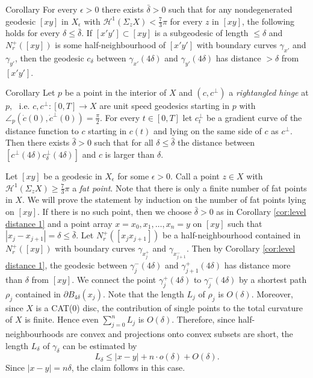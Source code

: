 \documentclass[a4paper,10pt]{amsart}
\begin{document}
\begin{thm}{Corollary}\label{cor:level distance 1}
For every $\epsilon>0$ there exists $\bar\delta>0$ such that for any nondegenerated geodesic $[xy]$ 
in $X_\epsilon$ with $\mathcal{H}^1(\Sigma_z X)< \frac{7}{3}\pi$
for every $z$ in $[xy]$, the following holds for every $\delta\leq\bar\delta$. 
If $[x'y']\subset[xy]$ is a subgeodesic of length $\leq\delta$ and $N^+_r([xy])$ is some half-neighbourhood 
of $[x'y']$ with boundary curves $\gamma_{x'}$ and $\gamma_{y'}$, 
then the geodesic $c_\delta$ between  $\gamma_{x'}(4\delta)$ and $\gamma_{y'}(4\delta)$ has distance $>\delta$
from $[x'y']$.
\end{thm}

\begin{thm}{Corollary}\label{cor:level distance 2}
Let $p$ be a point in the interior of $X$ and $(c,c^\perp)$ a {\em rightangled hinge} at $p$, \ i.e. $c,c^\perp:[0,T]\to X$ are unit speed geodesics starting in $p$
with $\angle_p(\dot c(0),\dot c^\perp (0))=\frac{\pi}{2}$. For every $t\in[0,T]$ let
$c^\perp_t$ be a gradient curve of the distance function to $c$ starting in $c(t)$ and lying on the same side
of $c$ as $c^\perp$. Then there exists $\hat\delta>0$ such that for all $\delta\leq\hat\delta$ the distance between 
$[c^\perp(4\delta)c^\perp_\delta(4\delta)]$
and $c$ is larger than $\delta$.
\end{thm}








Let $[xy]$ be a geodesic in $X_\epsilon$ for some $\epsilon>0$. Call a point
$z\in X$ with $\mathcal{H}^1(\Sigma_z X)\geq \frac{7}{3}\pi$ a {\em fat point}. 
Note that there is only a finite number of 
fat points in $X$. We will prove the statement by induction on  the number 
of fat points lying on $[xy]$. If there is no such point, then we choose $\bar\delta>0$ 
as in Corollary \ref{cor:level distance 1} and a point array
$x=x_0,x_1,\ldots,x_n=y$ on $[xy]$ such that $|x_j-x_{j+1}|=\delta\leq\bar\delta$. Let $N_r^ +([x_j x_{j+1}])$ 
be a half-neighbourhood contained in $N_r^ +([x y])$
with boundary curves $\gamma_{x_j^ +}$ and $\gamma_{x_{j+1}^ -}$. Then by Corollary \ref{cor:level distance 1}, 
the geodesic between $\gamma_j^ -(4\delta)$
and $\gamma_{j+1}^ +(4\delta)$ has distance more than $\delta$ from $[xy]$. We connect the point 
$\gamma_j^ +(4\delta)$ to $\gamma_j^ -(4\delta)$ by a shortest path $\rho_j$
contained in $\partial B_{4\delta}(x_j)$. Note that the length $L_j$ of $\rho_j$ is $O(\delta)$. 
Moreover, since $X$
is a CAT(0) disc, the contribution of single points to the total curvature of $X$ is finite. Hence 
even $\sum_{j=0}^ n L_j$ is $O(\delta)$.
Therefore, since half-neighbourhoods are convex and projections onto convex subsets are short, the 
length $L_\delta$ of $\gamma_\delta$ can be
estimated by 
$$
L_\delta\leq |x-y|+n\cdot o(\delta)+O(\delta).
$$
Since $|x-y|=n\delta$, the claim follows in this case.
\end{document}
